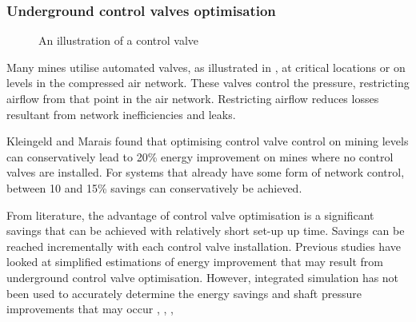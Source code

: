 		 \subsubsection{Underground control valves optimisation}
		 
		 \begin{figure}[!htbp]
		 	\centering
		 	\caption[An illustration of a control valve]{ An illustration of a control valve \cite{Kriel2014Masters}}
		 	\label{fig: Control Valve Illustration}
		 \end{figure}
		 Many mines utilise automated valves, as illustrated in , at critical locations or on levels in the compressed air network. These valves control the pressure, restricting airflow from that point in the air network. Restricting airflow reduces losses resultant from network inefficiencies and leaks.
		 \par 
		 Kleingeld and Marais \cite{kleingeld2010high} found that optimising control valve control on mining levels can conservatively lead to 20\% energy improvement on mines where no control valves are installed. For systems that already have some form of network control, between 10 and 15\% savings can conservatively be achieved.
		 \par 
		 From literature, the advantage of control valve optimisation is a significant savings that can be achieved with relatively short set-up up time. Savings can be reached incrementally with each control valve installation. Previous studies have looked at simplified estimations of energy improvement that may result from underground control valve optimisation. However, integrated simulation has not been used to accurately determine the energy savings and shaft pressure improvements that may occur \cite{kleingeld2010high}, \cite{marais2009increased}, \cite{Neser2008}, \cite{schroeder2009energy} %
